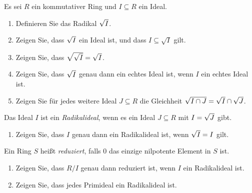 \begin{question}[subtitle = Radikale]
  \label{question: radical ideals}
  Es sei $R$ ein kommutativer Ring und $I \subseteq R$ ein Ideal.
  \begin{enumerate}
    \item
      Definieren Sie das Radikal $\sqrt{I}$.
    \item
      Zeigen Sie, dass $\sqrt{I}$ ein Ideal ist, und dass $I \subseteq \sqrt{I}$ gilt.
    \item
      Zeigen Sie, dass $\sqrt{\sqrt{I}} = \sqrt{I}$.
    \item
      Zeigen Sie, dass $\sqrt{I}$ genau dann ein echtes Ideal ist, wenn $I$ ein echtes Ideal ist.
    \item
      Zeigen Sie für jedes weitere Ideal $J \subseteq R$ die Gleichheit $\sqrt{I \cap J} = \sqrt{I} \cap \sqrt{J}$.
  \end{enumerate}
  Das Ideal $I$ ist ein \emph{Radikalideal}, wenn es ein Ideal $J \subseteq R$ mit $I = \sqrt{J}$ gibt.
  \begin{enumerate}[resume]
    \item
      Zeigen Sie, dass $I$ genau dann ein Radikalideal ist, wenn $\sqrt{I} = I$ gilt.
  \end{enumerate}
  Ein Ring $S$ heißt \emph{reduziert}, falls $0$ das einzige nilpotente Element in $S$ ist.
  \begin{enumerate}[resume]
    \item
      Zeigen Sie, dass $R/I$ genau dann reduziert ist, wenn $I$ ein Radikalideal ist.
    \item
      Zeigen Sie, dass jedes Primideal ein Radikalideal ist.
  \end{enumerate}
\end{question}


